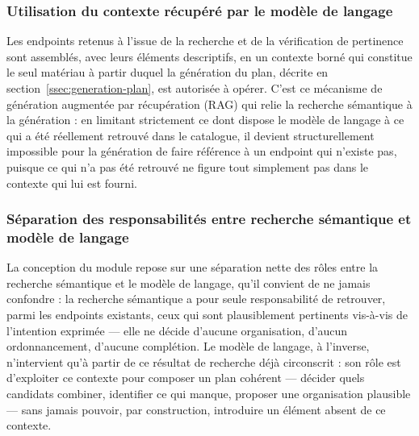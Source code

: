 \subsubsection{Utilisation du contexte récupéré par le modèle de langage}

Les endpoints retenus à l'issue de la recherche et de la vérification de pertinence sont assemblés, avec leurs éléments descriptifs, en un contexte borné qui constitue le seul matériau à partir duquel la génération du plan, décrite en section~\ref{ssec:generation-plan}, est autorisée à opérer. C'est ce mécanisme de génération augmentée par récupération (RAG) qui relie la recherche sémantique à la génération : en limitant strictement ce dont dispose le modèle de langage à ce qui a été réellement retrouvé dans le catalogue, il devient structurellement impossible pour la génération de faire référence à un endpoint qui n'existe pas, puisque ce qui n'a pas été retrouvé ne figure tout simplement pas dans le contexte qui lui est fourni.

\subsubsection{Séparation des responsabilités entre recherche sémantique et modèle de langage}

La conception du module repose sur une séparation nette des rôles entre la recherche sémantique et le modèle de langage, qu'il convient de ne jamais confondre : la recherche sémantique a pour seule responsabilité de retrouver, parmi les endpoints existants, ceux qui sont plausiblement pertinents vis-à-vis de l'intention exprimée — elle ne décide d'aucune organisation, d'aucun ordonnancement, d'aucune complétion. Le modèle de langage, à l'inverse, n'intervient qu'à partir de ce résultat de recherche déjà circonscrit : son rôle est d'exploiter ce contexte pour composer un plan cohérent — décider quels candidats combiner, identifier ce qui manque, proposer une organisation plausible — sans jamais pouvoir, par construction, introduire un élément absent de ce contexte.

